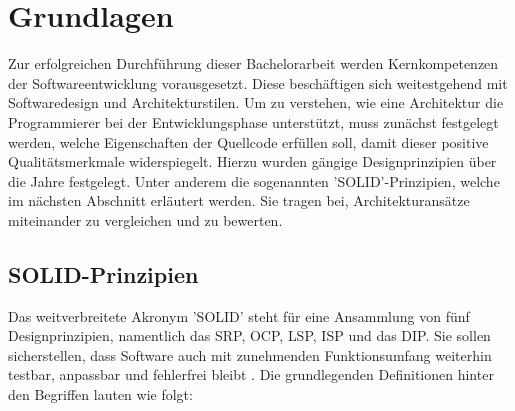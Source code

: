 

\chapter{Grundlagen}

Zur erfolgreichen Durchführung dieser Bachelorarbeit werden Kernkompetenzen der Softwareentwicklung vorausgesetzt. Diese beschäftigen sich weitestgehend mit Softwaredesign und Architekturstilen. Um zu verstehen, wie eine Architektur die Programmierer bei der Entwicklungsphase unterstützt, muss zunächst festgelegt werden, welche Eigenschaften der Quellcode erfüllen soll, damit dieser positive Qualitätsmerkmale widerspiegelt. Hierzu wurden gängige Designprinzipien über die Jahre festgelegt. Unter anderem die sogenannten 'SOLID'-Prinzipien, welche im nächsten Abschnitt erläutert werden. Sie tragen bei, Architekturansätze miteinander zu vergleichen und zu bewerten.

\section{SOLID-Prinzipien}

Das weitverbreitete Akronym 'SOLID' steht für eine Ansammlung von fünf Designprinzipien, namentlich das \acrfull{SRP}, \acrfull{OCP}, \acrfull{LSP}, \acrfull{ISP} und das \acrfull{DIP}. Sie sollen sicherstellen, dass Software auch mit zunehmenden Funktionsumfang weiterhin testbar, anpassbar und fehlerfrei bleibt \cite{Martin.2000, Martin.2018}. Die grundlegenden Definitionen hinter den Begriffen lauten wie folgt:


